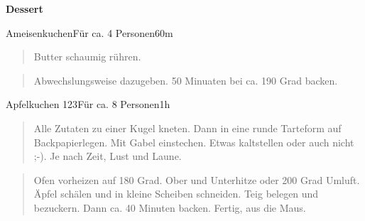 \documentclass[
  a4paper,
]{article}
\begin{document}
\newpage

\vspace*{\fill}

\textbf{\Huge \sf Dessert} \vspace*{\fill} \thispagestyle{empty}
\newpage

\begin{recipe}{Ameisenkuchen}{Für ca. 4 Personen}{60m}


\begin{quote}
Butter schaumig rühren.
\end{quote}

\freeform\hrulefill


\begin{quote}
Abwechslungsweise dazugeben. 50 Minuaten bei ca. 190 Grad backen.
\end{quote}

\freeform\hrulefill\newline{}\end{recipe}

\newpage

\begin{recipe}{Apfelkuchen 123}{Für ca. 8 Personen}{1h}


\begin{quote}
Alle Zutaten zu einer Kugel kneten. Dann in eine runde Tarteform auf
Backpapierlegen. Mit Gabel einstechen. Etwas kaltstellen oder auch nicht
;-). Je nach Zeit, Lust und Laune.
\end{quote}

\freeform\hrulefill


\begin{quote}
Ofen vorheizen auf 180 Grad. Ober und Unterhitze oder 200 Grad Umluft.
Äpfel schälen und in kleine Scheiben schneiden. Teig belegen und
bezuckern. Dann ca. 40 Minuten backen. Fertig, aus die Maus.
\end{quote}

\freeform\hrulefill\newline{}\end{recipe}
\end{document}
